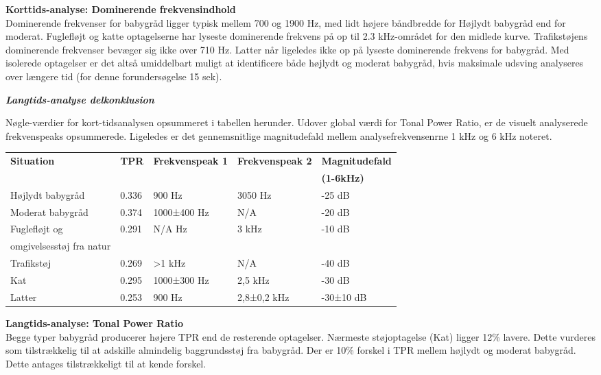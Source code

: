 \textbf{Korttids-analyse: Dominerende frekvensindhold}	\\
Dominerende frekvenser for babygråd ligger typisk mellem 700 og 1900 Hz, med lidt højere båndbredde for Højlydt babygråd end for moderat. Fuglefløjt og katte optagelserne har lyseste dominerende frekvens på op til 2.3 kHz-området for den midlede kurve. 
Trafikstøjens dominerende frekvenser bevæger sig ikke over 710 Hz. Latter når ligeledes ikke op på lyseste dominerende frekvens for babygråd. Med isolerede optagelser er det altså umiddelbart muligt at identificere både højlydt og moderat babygråd, hvis maksimale udsving analyseres over længere tid (for denne forundersøgelse 15 sek).

\newpage
\begin{center} \textit{\textbf{Langtids-analyse delkonklusion}} \end{center}
Nøgle-værdier for kort-tidsanalysen opsummeret i tabellen herunder. Udover global værdi for Tonal Power Ratio, er de visuelt analyserede frekvenspeaks opsummerede. Ligeledes er det gennemsnitlige magnitudefald mellem analysefrekvensenrne 1 kHz og 6 kHz noteret. 
\begin{center}
    \begin{tabular}{ | l | l | l | l | l |}
    \hline
    \textbf{Situation} 	& \textbf{TPR}  &\textbf{Frekvenspeak 1}	&\textbf{Frekvenspeak 2}	&\textbf{Magnitudefald} \\&&&&\textbf{(1-6kHz)}  	\\ \hline
    Højlydt babygråd 	& 0.336   				&900 Hz 				&3050 Hz				&-25 dB	\\ \hline
    Moderat babygråd 	& 0.374  				&1000±400 Hz 			&N/A					&-20 dB 	\\ \hline
    Fuglefløjt og 		& 0.291  				&N/A Hz 				&3 kHz					&-10 dB	\\ omgivelsesstøj fra natur & & & &	\\ \hline	
    Trafikstøj 			& 0.269  				&>1 kHz 				&N/A					&-40 dB	\\ \hline
    Kat 				& 0.295  				&1000±300 Hz			&2,5 kHz				&-30 dB	\\ \hline
    Latter 				& 0.253  				&900 Hz					&2,8±0,2 kHz			&-30±10 dB	\\ \hline
    \end{tabular}
\end{center}

\textbf{Langtids-analyse: Tonal Power Ratio}	\\
Begge typer babygråd producerer højere TPR end de resterende optagelser. Nærmeste støjoptagelse (Kat) ligger  12\% lavere. Dette vurderes som tilstrækkelig til at adskille almindelig baggrundsstøj fra babygråd. Der er 10\% forskel i TPR mellem højlydt og moderat babygråd. Dette antages tilstrækkeligt til at kende forskel.

